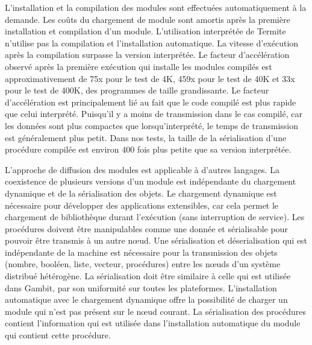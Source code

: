L'installation et la compilation des modules sont effectuées automatiquement à
la demande.  Les coûts du chargement de module sont amortis après la première
installation et compilation d'un module. L'utilisation interprétée de Termite
n'utilise pas la compilation et l'installation automatique.  La vitesse
d'exécution après la compilation surpasse la version interprétée.  Le facteur
d'accélération observé après la première exécution qui installe les modules
compilés est approximativement de 75x pour le test de 4K, 459x pour le test de
40K et 33x pour le test de 400K, des programmes de taille grandissante.  Le
facteur d'accélération est principalement lié au fait que le code compilé est
plus rapide que celui interprété.  Puisqu'il y a moins de transmission dans le
cas compilé, car les données sont plus compactes que lorsqu'interprété, le
temps de transmission est généralement plus petit. Dans nos tests, la taille de
la sérialisation d'une procédure compilée est environ 400 fois plus petite que
sa version interprétée.

L'approche de diffusion des modules est applicable à d'autres langages.  La
coexistence de plusieurs versions d'un module est indépendante du chargement
dynamique et de la sérialisation des objets. Le chargement dynamique est
nécessaire pour développer des applications extensibles, car cela permet le
chargement de bibliothèque durant l'exécution (sans interruption de service).
Les procédures doivent être manipulables comme une donnée et sérialisable pour
pouvoir être transmis à un autre nœud.  Une sérialisation et déserialisation
qui est indépendante de la machine est nécessaire pour la transmission des
objets (nombre, booléen, liste, vecteur, procédures) entre les nœuds d'un
système distribué hétérogène.  La sérialisation doit être similaire à celle qui
est utilisée dans Gambit, par son uniformité sur toutes les plateformes.
L'installation automatique avec le chargement dynamique offre la possibilité de
charger un module qui n'est pas présent sur le nœud courant.  La sérialisation
des procédures contient l'information qui est utilisée dans l'installation
automatique du module qui contient cette procédure.


